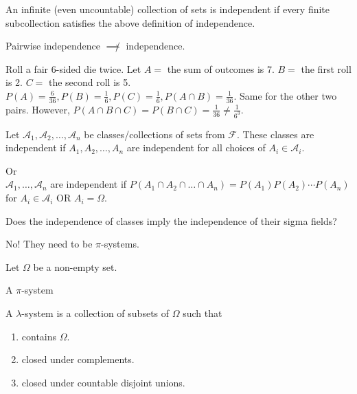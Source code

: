 \documentclass[class=article,crop=false]{standalone}
\begin{document}
\begin{defn}[]
	An infinite (even uncountable) collection of sets is independent if every finite subcollection satisfies the above definition of independence.
\end{defn}

\begin{note}[]
Pairwise independence $ \not \implies$ independence.
\begin{eg}[]
	Roll a fair 6-sided die twice. Let $ A=$ the sum of outcomes is 7.  $ B =$ the first roll is 2. $ C=$ the second roll is 5.  $ P(A)=\frac{6}{36},P(B)=\frac{1}{6},P(C)=\frac{1}{6}, P(A \cap  B) = \frac{1}{36}$. Same for the other two pairs. However, $ P(A \cap B \cap C) = P(B \cap C)= \frac{1}{36} \neq \frac{1}{6^3}$. 
\end{eg}
\end{note}

\begin{defn}[]
Let $ \mathcal{A}_1, \mathcal{A}_2, \ldots, \mathcal{A}_n$ be classes/collections of sets from $ \mathcal{F}$. These classes are independent if $ A_1, A_2,\ldots,A_n$ are independent for all choices of $ A_i \in \mathcal{A}_i$.

Or\\

$ \mathcal{A}_1,\ldots,\mathcal{A}_n$ are independent if $ P(A_1 \cap A_2 \cap \ldots \cap A_n) = P(A_1)P(A_2)\cdots P(A_n)$ for $ A_i \in \mathcal{A}_i$ OR $ A_i = \Omega$.

\end{defn}

Does the independence of classes imply the independence of their sigma fields?

No! They need to be $ \pi$-systems.

Let $\Omega$ be a non-empty set. 

\begin{defn}[]
A $ \pi$-system 
\end{defn}
\begin{defn}
A $\lambda$-system is a collection of subsets of $ \Omega$ such that 
\begin{enumerate}[label=(\roman*)]
	\item contains $ \Omega$.
	\item closed under complements.
	\item closed under countable disjoint unions.
\end{enumerate}
\end{defn}
\end{document}
